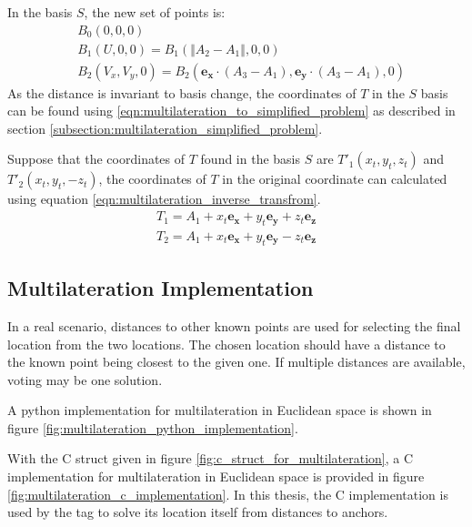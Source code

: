 \documentclass[\main/thesis.tex]{subfiles}
\begin{document}
In the basis $S$, the new set of points is:
\begin{equation}
    \begin{split}
        &B_0(0,0,0) \\
        &B_1(U, 0, 0) = B_1(\Vert A_2 - A_1 \Vert, 0, 0) \\
        &B_2(V_x, V_y, 0) = B_2(\boldsymbol{e_x} \cdot (A_3 - A_1), \boldsymbol{e_y} \cdot (A_3 - A_1), 0) 
    \end{split}
    \label{eqn:multilateration_to_simplified_problem}
\end{equation}
As the distance is invariant to basis change, the coordinates of $T$ in the $S$ basis can be found using \ref{eqn:multilateration_to_simplified_problem} as described in section \ref{subsection:multilateration_simplified_problem}.

Suppose that the coordinates of $T$ found in the basis $S$ are $T'_1(x_t,y_t,z_t)$ and $T'_2(x_t, y_t, -z_t)$, the coordinates of $T$ in the original coordinate can calculated using equation \ref{eqn:multilateration_inverse_transfrom}.
\begin{equation}
    \begin{split}
        T_1 = A_1 + x_t\boldsymbol{e_x} + y_t\boldsymbol{e_y} + z_t\boldsymbol{e_z} \\
        T_2 = A_1 + x_t\boldsymbol{e_x} + y_t\boldsymbol{e_y} - z_t\boldsymbol{e_z} 
    \end{split}
    \label{eqn:multilateration_inverse_transfrom}
\end{equation}

\subsection{Multilateration Implementation}

In a real scenario, distances to other known points are used for selecting the final location from the two locations. The chosen location should have a distance to the known point being closest to the given one. If multiple distances are available, voting may be one solution.

A python implementation for multilateration in Euclidean space is shown in figure \ref{fig:multilateration_python_implementation}.

With the C struct given in figure \ref{fig:c_struct_for_multilateration}, a C implementation for multilateration in Euclidean space is provided in figure \ref{fig:multilateration_c_implementation}. In this thesis, the C implementation is used by the tag to solve its location itself from distances to anchors.
\end{document}
